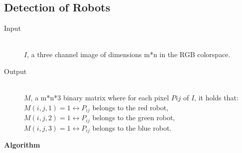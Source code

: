 \documentclass[10pt,a4paper]{article}
\begin{document}
\subsection{Detection of Robots}\label{coloralgo}
\begin{description}
\item[Input] \hfill \\
    $I$, a three channel image of dimensions m*n in the RGB colorspace.
\item[Output] \hfill \\
    $M$, a m*n*3 binary matrix where for each pixel $P{ij}$ of $I$, it holds 
    that: \\
    $M(i,j,1) = 1 \leftrightarrow P_{ij}$ belongs to the red robot, \\
    $M(i,j,2) = 1 \leftrightarrow P_{ij}$ belongs to the green robot, \\
    $M(i,j,3) = 1 \leftrightarrow P_{ij}$ belongs to the blue robot.
\end{description}
\textbf{Algorithm}
\end{document}
